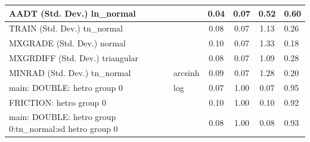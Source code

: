 \begin{table}
\begin{center}
\begin{tabular}{|l|l|c|c|c|l|}
			\hline
			AADT (Std. Dev.) ln_normal &  & 0.04 & 0.07 & 0.52 & 0.60 \\
			\hline
			TRAIN (Std. Dev.) tn_normal &  & 0.08 & 0.07 & 1.13 & 0.26 \\
			\hline
			MXGRADE (Std. Dev.) normal &  & 0.10 & 0.07 & 1.33 & 0.18 \\
			\hline
			MXGRDIFF (Std. Dev.) triangular &  & 0.08 & 0.07 & 1.09 & 0.28 \\
			\hline
			MINRAD (Std. Dev.) tn_normal & arcsinh & 0.09 & 0.07 & 1.28 & 0.20 \\
			\hline
			main: DOUBLE: hetro group 0 & log & 0.07 & 1.00 & 0.07 & 0.95 \\
			\hline
			FRICTION: hetro group 0 &  & 0.10 & 1.00 & 0.10 & 0.92 \\
			\hline
			main: DOUBLE: hetro group 0:tn_normal:sd  hetro group 0 &  & 0.08 & 1.00 & 0.08 & 0.93 \\
			\hline
		\end{tabular}
	\end{center}
\end{table}